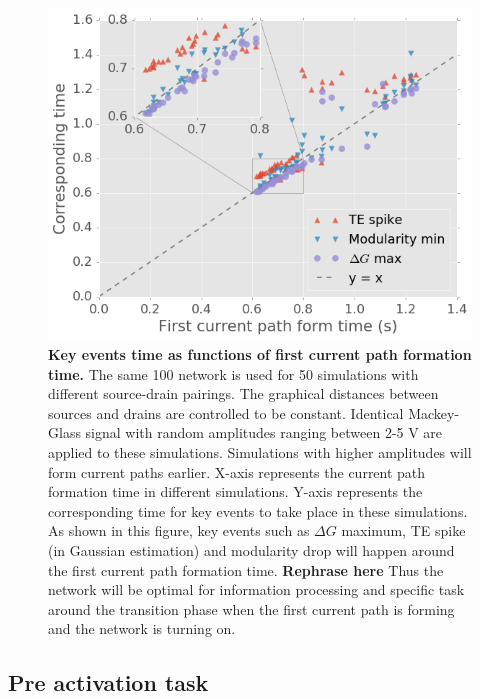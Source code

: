 \documentclass[%
 reprint,
 amsmath,amssymb,
 aps,
]{revtex4-2}
\begin{document}
\begin{figure}[h]
	\centering
	\includegraphics[width=1\linewidth]{figure/time_align}
	\caption{\textbf{Key events time as functions of first current path formation time.} 
			The same 100 network is used for 50 simulations with different source-drain pairings. The graphical distances between sources and drains are controlled to be constant. Identical Mackey-Glass signal with random amplitudes ranging between 2-5 V are applied to these simulations. Simulations with higher amplitudes will form current paths earlier. 
			\newline 
			X-axis represents the current path formation time in different simulations. Y-axis represents the corresponding time for key events to take place in these simulations. As shown in this figure, key events such as $\Delta G$ maximum, TE spike (in Gaussian estimation) and modularity drop will happen around the first current path formation time. 
			\newline
			\textbf{Rephrase here} Thus the network will be optimal for information processing and specific task around the transition phase when the first current path is forming and the network is turning on. }
	\label{fig:time_align}
\end{figure}






\newpage
\subsection{Pre activation task}
\end{document}
